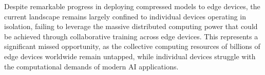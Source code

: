 


Despite remarkable progress in deploying compressed models to edge devices, the current landscape remains largely confined to individual devices operating in isolation, failing to leverage the massive distributed computing power that could be achieved through collaborative training across edge devices. This represents a significant missed opportunity, as the collective computing resources of billions of edge devices worldwide remain untapped, while individual devices struggle with the computational demands of modern AI applications.

